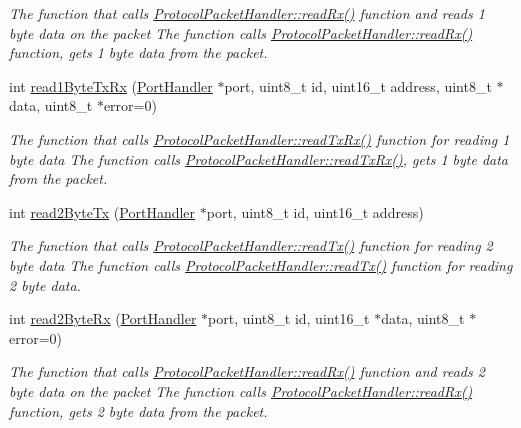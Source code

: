 \begin{DoxyCompactItemize}
\begin{DoxyCompactList}\small\item\em The function that calls \hyperlink{classmercury_1_1_protocol_packet_handler_af7ff32d0eca6395b92bf7efc02118a27}{Protocol\+Packet\+Handler\+::read\+Rx()} function and reads 1 byte data on the packet  The function calls \hyperlink{classmercury_1_1_protocol_packet_handler_af7ff32d0eca6395b92bf7efc02118a27}{Protocol\+Packet\+Handler\+::read\+Rx()} function,  gets 1 byte data from the packet. \end{DoxyCompactList}\item 
int \hyperlink{classmercury_1_1_protocol_packet_handler_a1b5c51858c5bde55912fe5adf89df8a2}{read1\+Byte\+Tx\+Rx} (\hyperlink{classmercury_1_1_port_handler}{Port\+Handler} $\ast$port, uint8\+\_\+t id, uint16\+\_\+t address, uint8\+\_\+t $\ast$data, uint8\+\_\+t $\ast$error=0)
\begin{DoxyCompactList}\small\item\em The function that calls \hyperlink{classmercury_1_1_protocol_packet_handler_a368325ca9c0c783b1e88ef32a4544e51}{Protocol\+Packet\+Handler\+::read\+Tx\+Rx()} function for reading 1 byte data  The function calls \hyperlink{classmercury_1_1_protocol_packet_handler_a368325ca9c0c783b1e88ef32a4544e51}{Protocol\+Packet\+Handler\+::read\+Tx\+Rx()},  gets 1 byte data from the packet. \end{DoxyCompactList}\item 
int \hyperlink{classmercury_1_1_protocol_packet_handler_a39f55a7a7cb8f8bd9b4c2a1bfb84f855}{read2\+Byte\+Tx} (\hyperlink{classmercury_1_1_port_handler}{Port\+Handler} $\ast$port, uint8\+\_\+t id, uint16\+\_\+t address)
\begin{DoxyCompactList}\small\item\em The function that calls \hyperlink{classmercury_1_1_protocol_packet_handler_aebb2c28d6b3f2e87c7a56b757a24810b}{Protocol\+Packet\+Handler\+::read\+Tx()} function for reading 2 byte data  The function calls \hyperlink{classmercury_1_1_protocol_packet_handler_aebb2c28d6b3f2e87c7a56b757a24810b}{Protocol\+Packet\+Handler\+::read\+Tx()} function for reading 2 byte data. \end{DoxyCompactList}\item 
int \hyperlink{classmercury_1_1_protocol_packet_handler_a1d22ce94f06b67aa60172567d70330bf}{read2\+Byte\+Rx} (\hyperlink{classmercury_1_1_port_handler}{Port\+Handler} $\ast$port, uint8\+\_\+t id, uint16\+\_\+t $\ast$data, uint8\+\_\+t $\ast$error=0)
\begin{DoxyCompactList}\small\item\em The function that calls \hyperlink{classmercury_1_1_protocol_packet_handler_af7ff32d0eca6395b92bf7efc02118a27}{Protocol\+Packet\+Handler\+::read\+Rx()} function and reads 2 byte data on the packet  The function calls \hyperlink{classmercury_1_1_protocol_packet_handler_af7ff32d0eca6395b92bf7efc02118a27}{Protocol\+Packet\+Handler\+::read\+Rx()} function,  gets 2 byte data from the packet. \end{DoxyCompactList}\item 

\end{DoxyCompactItemize}
